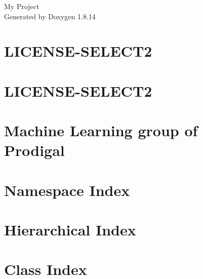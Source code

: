 \documentclass[twoside]{book}
\newcommand{\+}{\discretionary{\mbox{\scriptsize$\hookleftarrow$}}{}{}}
\newcommand{\clearemptydoublepage}{%
  \newpage{\pagestyle{empty}\cleardoublepage}%
}
\begin{document}
\hypersetup{pageanchor=false,
             bookmarksnumbered=true,
             pdfencoding=unicode
            }
\begin{titlepage}
\vspace*{7cm}
\begin{center}%
{\Large My Project }\\
\vspace*{1cm}
{\large Generated by Doxygen 1.8.14}\\
\end{center}
\end{titlepage}
\clearemptydoublepage
{}
\tableofcontents
\clearemptydoublepage
{}
\hypersetup{pageanchor=true}

\chapter{L\+I\+C\+E\+N\+S\+E-\/\+S\+E\+L\+E\+C\+T2}
\label{md_backend_static_admin_css_vendor_select2__l_i_c_e_n_s_e-_s_e_l_e_c_t2}

\chapter{L\+I\+C\+E\+N\+S\+E-\/\+S\+E\+L\+E\+C\+T2}
\label{md_backend_static_admin_js_vendor_select2__l_i_c_e_n_s_e-_s_e_l_e_c_t2}

\chapter{Machine Learning group of Prodigal}
\label{md__r_e_a_d_m_e}

\chapter{Namespace Index}

\chapter{Hierarchical Index}

\chapter{Class Index}

\end{document}
